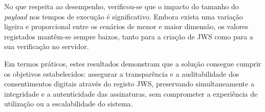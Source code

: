 No que respeita ao desempenho, verificou-se que o impacto do tamanho do \textit{payload} nos tempos de execução é significativo. Embora exista uma variação ligeira e proporcional entre os cenários de menor e maior dimensão, os valores registados mantêm-se sempre baixos, tanto para a criação de JWS como para a sua verificação no servidor.

Em termos práticos, estes resultados demonstram que a solução consegue cumprir os objetivos estabelecidos: assegurar a transparência e a auditabilidade dos consentimentos digitais através do registo JWS, preservando simultaneamente a integridade e a autenticidade das assinaturas, sem comprometer a experiência de utilização ou a escalabilidade do sistema.
